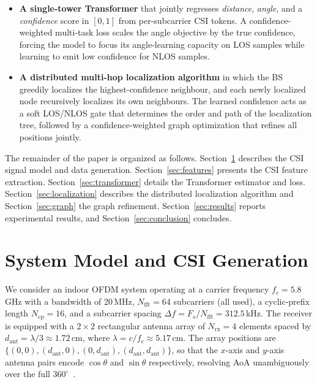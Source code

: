 \documentclass[conference]{IEEEtran}
\begin{document}
\begin{itemize}
\item \textbf{A single-tower Transformer} that jointly regresses
      \emph{distance}, \emph{angle}, and a \emph{confidence} score in $[0,1]$
      from per-subcarrier CSI tokens. A confidence-weighted multi-task loss
      scales the angle objective by the true confidence, forcing the model to
      focus its angle-learning capacity on LOS samples while learning to emit
      low confidence for NLOS samples.
\item \textbf{A distributed multi-hop localization algorithm} in which the BS
      greedily localizes the highest-confidence neighbour, and each newly
      localized node recursively localizes its own neighbours. The learned
      confidence acts as a soft LOS/NLOS gate that determines the order and
      path of the localization tree, followed by a confidence-weighted graph
      optimization that refines all positions jointly.
\end{itemize}

The remainder of the paper is organized as follows. Section~\ref{sec:model}
describes the CSI signal model and data generation. Section~\ref{sec:features}
presents the CSI feature extraction. Section~\ref{sec:transformer} details the
Transformer estimator and loss. Section~\ref{sec:localization} describes the
distributed localization algorithm and Section~\ref{sec:graph} the graph
refinement. Section~\ref{sec:results} reports experimental results, and
Section~\ref{sec:conclusion} concludes.

\section{System Model and CSI Generation}
\label{sec:model}

We consider an indoor OFDM system operating at a carrier frequency
$f_c=5.8$\,GHz with a bandwidth of $20$\,MHz, $N_{\mathrm{fft}}=64$ subcarriers
(all used), a cyclic-prefix length $N_{\mathrm{cp}}=16$, and a subcarrier
spacing $\Delta f = F_s/N_{\mathrm{fft}} = 312.5$\,kHz. The receiver is equipped
with a $2\times 2$ rectangular antenna array of $N_{\mathrm{rx}}=4$ elements
spaced by $d_{\mathrm{ant}}=\lambda/3 \approx 1.72$\,cm, where
$\lambda = c/f_c \approx 5.17$\,cm. The array positions are
$\{(0,0),(d_{\mathrm{ant}},0),(0,d_{\mathrm{ant}}),(d_{\mathrm{ant}},d_{\mathrm{ant}})\}$,
so that the $x$-axis and $y$-axis antenna pairs encode $\cos\theta$ and
$\sin\theta$ respectively, resolving AoA unambiguously over the full
$360^{\circ}$~\cite{xiong2013arraytrack}.
\end{document}
